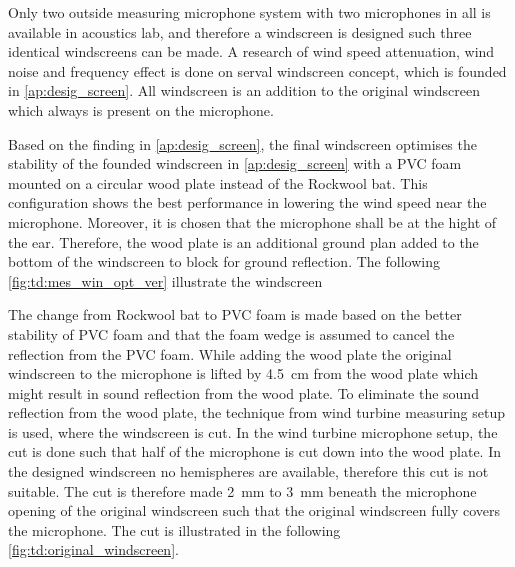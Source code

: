 Only two outside measuring microphone system with two microphones in all is available in acoustics lab, and therefore a windscreen is designed such three identical windscreens can be made. A research of wind speed attenuation, wind noise and frequency effect is done on serval windscreen concept, which is founded in \autoref{ap:desig_screen}. All windscreen is an addition to the original windscreen which always is present on the microphone. 

Based on the finding in \autoref{ap:desig_screen}, the final windscreen optimises the stability of the founded windscreen in \autoref{ap:desig_screen} with a PVC foam mounted on a circular wood plate instead of the Rockwool bat. This configuration shows the best performance in lowering the wind speed near the microphone. Moreover, it is chosen that the microphone shall be at the hight of the ear. Therefore, the wood plate is an additional ground plan added to the bottom of the windscreen to block for ground reflection. The following \autoref{fig:td:mes_win_opt_ver} illustrate the windscreen


The change from Rockwool bat to PVC foam is made based on the better stability of PVC foam and that the foam wedge is assumed to cancel the reflection from the PVC foam. While adding the wood plate the original windscreen to the microphone is lifted by \SI{4.5}{\centi\meter} from the wood plate which might result in sound reflection from the wood plate. To eliminate the sound reflection from the wood plate, the technique from wind turbine measuring setup is used, where the windscreen is cut. In the wind turbine microphone setup, the cut is done such that half of the microphone is cut down into the wood plate. In the designed windscreen no hemispheres are available, therefore this cut is not suitable. The cut is therefore made \SI{2}{\milli\meter} to \SI{3}{\milli\meter} beneath the microphone opening of the original windscreen such that the original windscreen fully covers the microphone. The cut is illustrated in the following \autoref{fig:td:original_windscreen}. 




